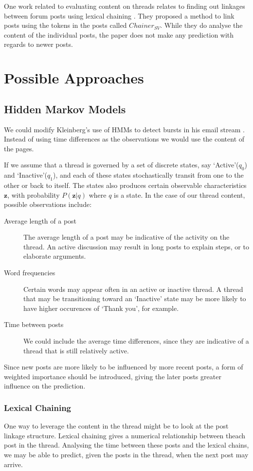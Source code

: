 \documentclass[12 pt]{article}
\begin{document}
One work related to evaluating content on threads relates to finding out linkages between forum posts using lexical chaining \cite{Wang2011}. They proposed a method to link posts using the tokens in the posts called $Chainer_{SV}$. While they do analyse the content of the individual posts, the paper does not make any prediction with regards to newer posts.



\section{Possible Approaches}

\subsection{Hidden Markov Models}
We could modify Kleinberg's use of HMMs to detect bursts in his email stream \cite{Kleinberg2003}. Instead of using time differences as the observations we would use the content of the pages.

If we assume that a thread is governed by a set of discrete states, say `Active'($q_0$) and `Inactive'($q_1$), and each of these states stochastically transit from one to the other or back to itself. The states also produces certain observable characteristics $\mathbf{z}$, with probability $P(\mathbf{z}|q)$ where $q$ is a state. In the case of our thread content, possible observations include:
\begin{description}
	\item[Average length of a post] The average length of a post may be indicative of the activity on the thread. An active discussion may result in long posts to explain steps, or to elaborate arguments.
	\item[Word frequencies] Certain words may appear often in an active or inactive thread. A thread that may be transitioning toward an `Inactive' state may be more likely to have higher occurences of `Thank you', for example.
	\item[Time between posts] We could include the average time differences, since they are indicative of a thread that is still relatively active.
\end{description}
Since new posts are more likely to be influenced by more recent posts, a form of weighted importance should be introduced, giving the later posts greater influence on the prediction.

\subsubsection{Lexical Chaining}
One way to leverage the content in the thread might be to look at the post linkage structure. Lexical chaining gives a numerical relationship between theach post in the thread. Analysing the time between these posts and the lexical chains, we may be able to predict, given the posts in the thread, when the next post may arrive.
\end{document}
